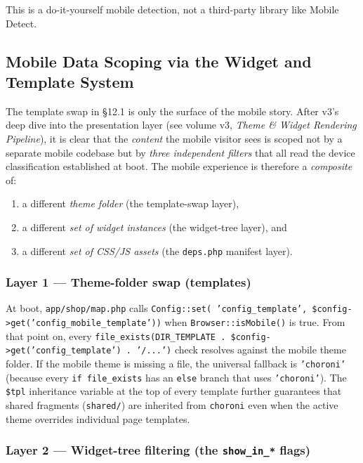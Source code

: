 \documentclass[11pt,a4paper]{article}
\begin{document}
This is a do-it-yourself mobile detection, not a third-party library
like Mobile Detect.

\subsection{Mobile Data Scoping via the Widget and Template System}\label{sec:mobile-widget-scoping}

The template swap in \S12.1 is only the surface of the mobile story.
After v3's deep dive into the presentation layer (see volume v3,
\emph{Theme \& Widget Rendering Pipeline}), it is clear that the
\emph{content} the mobile visitor sees is scoped not by a separate
mobile codebase but by \emph{three independent filters} that all
read the device classification established at boot. The mobile
experience is therefore a \emph{composite} of:

\begin{enumerate}[leftmargin=1.6em,itemsep=2pt]
  \item a different \emph{theme folder} (the template-swap layer),
  \item a different \emph{set of widget instances} (the widget-tree
        layer), and
  \item a different \emph{set of CSS/JS assets} (the
        \texttt{deps.php} manifest layer).
\end{enumerate}

\subsubsection{Layer 1 --- Theme-folder swap (templates)}

At boot, \texttt{app/shop/map.php} calls \texttt{Config::set(
'config\_template', \$config->get('config\_mobile\_template'))}
when \texttt{Browser::isMobile()} is true. From that point on,
every \texttt{file\_exists(DIR\_TEMPLATE . \$config->get('config\_template')
. '/...')} check resolves against the mobile theme folder. If the
mobile theme is missing a file, the universal fallback is
\texttt{'choroni'} (because every \texttt{if file\_exists} has an
\texttt{else} branch that uses \texttt{'choroni'}). The
\texttt{\$tpl} inheritance variable at the top of every template
further guarantees that shared fragments (\texttt{shared/}) are
inherited from \texttt{choroni} even when the active theme
overrides individual page templates.

\subsubsection{Layer 2 --- Widget-tree filtering (the
\texttt{show\_in\_*} flags)}
\end{document}
